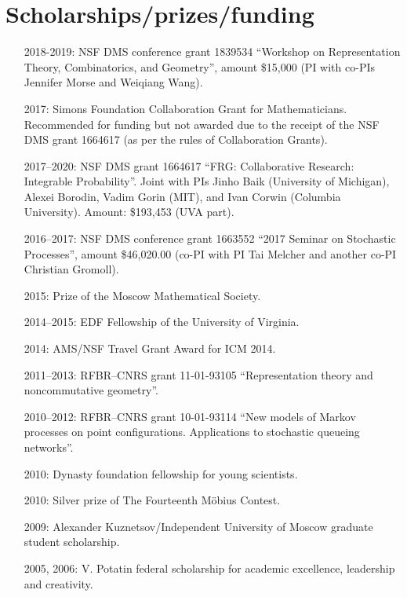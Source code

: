 \documentclass[letterpaper,11pt]{article}
\begin{document}
\section*{Scholarships/prizes/funding}
\begin{itemize}
	
	\item 
				[2018-2019:]
				NSF DMS conference grant 
				1839534
				``Workshop on Representation Theory, Combinatorics, and Geometry'',
				amount \$15,000
				(PI with co-PIs Jennifer Morse and Weiqiang Wang).
	\item
	      [2017:] Simons Foundation Collaboration Grant for
	      Mathematicians. Recommended for funding but not awarded due to
	      the receipt of the NSF DMS grant 1664617 (as per the rules of Collaboration
	      Grants).
	\item
	      [2017--2020:] NSF DMS grant 1664617
	      ``FRG: Collaborative Research: Integrable Probability''.
	      Joint with PIs Jinho Baik (University of Michigan), Alexei
	      Borodin, Vadim Gorin (MIT), and Ivan Corwin (Columbia University). Amount:
	      \$193,453 (UVA part).
	\item
	      [2016--2017:]
	      NSF DMS conference grant 1663552 ``2017 Seminar on Stochastic
	      Processes'', amount \$46,020.00 (co-PI with PI Tai Melcher and another co-PI
	      Christian Gromoll).
	\item
	      [2015:] Prize of the Moscow Mathematical Society.
	\item
	      [2014--2015:] EDF Fellowship of the University of Virginia.
	\item
	      [2014:] AMS/NSF Travel Grant Award for ICM 2014.
	\item
	      [2011--2013:] RFBR--CNRS grant 11-01-93105 ``Representation
	      theory and noncommutative geometry''.
	\item
	      [2010--2012:] RFBR--CNRS grant 10-01-93114 ``New models of
	      Markov processes on point configurations. Applications to
	      stochastic queueing networks''.
	\item
	      [2010:] Dynasty foundation fellowship for young scientists.
	\item
	      [2010:] Silver prize of The Fourteenth M\"obius Contest.
	\item
	      [2009:] Alexander Kuznetsov/Independent University of Moscow
	      graduate student scholarship.
	\item
	      [2005, 2006:] V. Potatin federal scholarship for academic
	      excellence, leadership and creativity.
\end{itemize}
\end{document}
